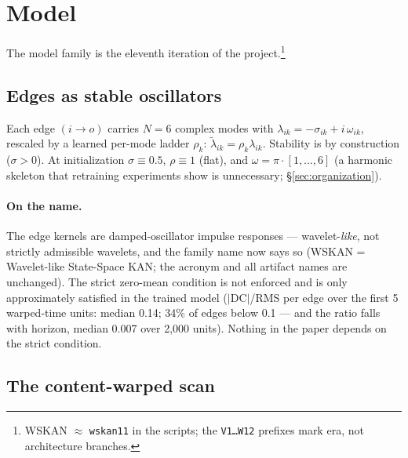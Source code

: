 \documentclass[11pt]{article}
\newcommand{\wskan}{WSKAN}
\begin{document}
\section{Model}
\label{sec:model}

The model family is the eleventh iteration of the
project.\footnote{\wskan{} $\approx$ \texttt{wskan11} in the scripts; the
\texttt{V1\ldots W12} prefixes mark era, not architecture branches.}

\subsection{Edges as stable oscillators}

Each edge $(i \to o)$ carries $N{=}6$ complex modes with
$\lambda_{ik} = -\sigma_{ik} + i\,\omega_{ik}$, rescaled by a learned
per-mode ladder $\rho_k$: $\tilde\lambda_{ik} = \rho_k \lambda_{ik}$.
Stability is by construction ($\sigma > 0$). At initialization
$\sigma \equiv 0.5$, $\rho \equiv 1$ (flat), and
$\omega = \pi \cdot [1,\dots,6]$ (a harmonic skeleton that retraining
experiments show is unnecessary; \S\ref{sec:organization}).

\paragraph{On the name.}
The edge kernels are damped-oscillator impulse responses ---
wavelet-\emph{like}, not strictly admissible wavelets, and the family name
now says so (WSKAN = Wavelet-like State-Space KAN; the acronym and all
artifact names are unchanged). The strict
zero-mean condition is not enforced and is only approximately satisfied in
the trained model ($|$DC$|$/RMS per edge over the first 5 warped-time
units: median 0.14; 34\% of edges below 0.1 --- and the ratio falls with
horizon, median 0.007 over 2{,}000 units). Nothing in the paper depends on the strict condition.

\subsection{The content-warped scan}
\end{document}
